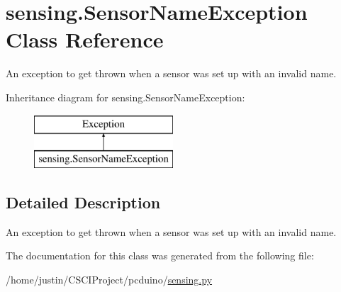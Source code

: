 \hypertarget{classsensing_1_1_sensor_name_exception}{\section{sensing.\-Sensor\-Name\-Exception Class Reference}
\label{classsensing_1_1_sensor_name_exception}
}


An exception to get thrown when a sensor was set up with an invalid name.  


Inheritance diagram for sensing.\-Sensor\-Name\-Exception\-:\begin{figure}[H]
\begin{center}
\leavevmode
\includegraphics[height=2.000000cm]{classsensing_1_1_sensor_name_exception}
\end{center}
\end{figure}


\subsection{Detailed Description}
An exception to get thrown when a sensor was set up with an invalid name. 

The documentation for this class was generated from the following file\-:\begin{DoxyCompactItemize}
\item 
/home/justin/\-C\-S\-C\-I\-Project/pcduino/\hyperlink{sensing_8py}{sensing.\-py}\end{DoxyCompactItemize}
